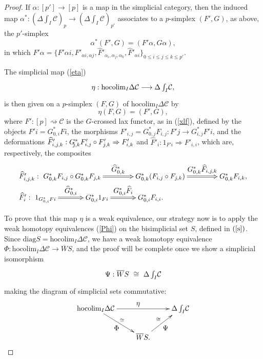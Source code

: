 \documentclass[]{amsart}
\begin{document}
\begin{proof}
If $\alpha:[p']\to [p]$ is a map in the simplicial category, then the induced map
$\alpha^*:({\ensuremath{\Delta}}\int_I\!{\ensuremath{\mathcal{C}}})_p\to ({\ensuremath{\Delta}}\int_I\!{\ensuremath{\mathcal{C}}})_{p'}$ associates to a $p$-simplex $(F',G)$, as
above, the $p'$-simplex
$$\alpha^*(F',G)=(F'\alpha,G\alpha),$$
in which $F'\alpha=\{F'\!{\alpha i},F'_{\alpha i,\alpha
j},\widehat{F}'_{\alpha_i,\alpha_j,\alpha_k}, \widehat{F}'_{\alpha i}\}_{0\leq i\leq j\leq k\leq
p'}$.

The simplicial map (\ref{eta})  $$\xymatrix{\eta: {\ensuremath{\mathrm{hocolim}}}_I{\ensuremath{\Delta}}{\ensuremath{\mathcal{C}}}\longrightarrow {\ensuremath{\Delta}}\int_I\!{\ensuremath{\mathcal{C}}},}$$
is then given on a $p$-simplex $(F,G)$ of ${\ensuremath{\mathrm{hocolim}}}_I{\ensuremath{\Delta}}{\ensuremath{\mathcal{C}}}$ by $$\eta(F,G)=(F',G),$$ where
$F':[p]\rightsquigarrow {\ensuremath{\mathcal{C}}}$ is the $G$-crossed lax functor, as in (\ref{xlf}), defined by the
objects $F'\!i=G^*_{0,i}Fi$, the morphisms $F'_{i,j}=G^*_{0,j}F_{i,j}:F'\!j\rightarrow
G_{i,j}^*F'\!i$, and the deformations  $\widehat{F}'_{i,j,k}:G_{\hspace{-3pt}j,k}^*F'_{i,j}\circ
F'_{j,k}\Rightarrow F'_{i,k}$ and $\widehat{F}'_{i}:1_{F'\!i}\Rightarrow F'_{i,i}$, which are,
respectively, the composites
$$\begin{array}{l}
\xymatrix@C=42pt{\widehat{F}'_{i,j,k}:\ G^*_{0,k}F_{i,j}\circ G^*_{0,k}F_{j,k}\ar@{=>}[r]^-{\textstyle \widehat{G}_{0,k}^*}&G^*_{0,k}(F_{i,j}\circ F_{j,k})\ar@{=>}[r]^-{\textstyle G_{0,k}^*\widehat{F}_{i,j,k}}&G^*_{0,k}F_{i,k},}\\[4pt]
\xymatrix@C=35pt{\widehat{F}'_{i}: \ 1_{G^*_{0,i}Fi}\ar@{=>}[r]^-{\textstyle
\widehat{G}^*_{0,i}}&G^*_{0,i}1_{Fi}\ar@{=>}[r]^-{\textstyle
G^*_{0,i}\widehat{F}_i}&G_{0,i}^*F_{i,i}.}
\end{array}
$$

To prove that this map $\eta$ is a weak equivalence, our strategy now is to apply the weak homotopy
equivalences (\ref{Phi}) on the bisimplicial set  $S$, defined in $(\ref{s})$. Since ${\ensuremath{\mathrm{diag}}} S=
{\ensuremath{\mathrm{hocolim}}}_I{\ensuremath{\Delta}}{\ensuremath{\mathcal{C}}}$, we have a weak homotopy equivalence ${\Phi: {\ensuremath{\mathrm{hocolim}}}_I{\ensuremath{\Delta}}{\ensuremath{\mathcal{C}}} \to \overline{W}S}$,
and the proof will be complete once we show a simplicial isomorphism
$$\xymatrix{\Psi: \overline{W}S\ \cong \ {\ensuremath{\Delta}}\int_I\!{\ensuremath{\mathcal{C}}}}$$ making  the diagram of simplicial sets commutative:
\begin{equation}\label{tf}\xymatrix{{\ensuremath{\mathrm{hocolim}}}_I{\ensuremath{\Delta}}{\ensuremath{\mathcal{C}}}\ar[rr]^{\textstyle \eta}\ar[rd]_{\textstyle \Phi}^\simeq&&{\ensuremath{\Delta}}\int_I\!{\ensuremath{\mathcal{C}}}\\&\overline{W}S.\ar[ru]_{\textstyle \Psi}^\cong&}
\end{equation}


\end{proof}
\end{document}
